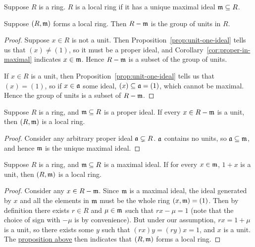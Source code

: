 \begin{definition}
    Suppose \(R\) is a ring.
    \(R\) is a local ring if it has a unique maximal ideal \(\mathfrak{m} \subseteq R\).
\end{definition}
\begin{theorem}
    Suppose \((R,\mathfrak{m})\) forms a local ring.
    Then \(R-\mathfrak{m}\) is the group of units in \(R\).
\end{theorem}
\begin{proof}
    Suppose \(x \in R\) is not a unit.
    Then Proposition~\ref{prop:unit-one-ideal} tells us that \((x) \neq (1)\),
    so it must be a proper ideal,
    and Corollary~\ref{cor:proper-in-maximal} indicates \(x \in \mathfrak{m}\).
    Hence \(R-\mathfrak{m}\) is a subset of the group of units.

    If \(x \in R\) is a unit,
    then Proposition~\ref{prop:unit-one-ideal} tells us that \((x) = (1)\),
    so if \(x \in \mathfrak{a}\) some ideal, \((x) \subseteq \mathfrak{a} = (1)\),
    which cannot be maximal.
    Hence the group of units is a subset of \(R-\mathfrak{m}\).
\end{proof}
\begin{proposition}\label{prop:local-ring-units}
    Suppose \(R\) is a ring, and \(\mathfrak{m} \subseteq R\) is a proper ideal.
    If every \(x \in R-\mathfrak{m}\) is a unit, then \((R,\mathfrak{m})\) is a local ring.
\end{proposition}
\begin{proof}
    Consider any arbitrary proper ideal \(\mathfrak{a} \subsetneq R\).
    \(\mathfrak{a}\) contains no units, so \(\mathfrak{a} \subseteq \mathfrak{m}\),
    and hence \(\mathfrak{m}\) is the unique maximal ideal.
\end{proof}
\begin{proposition}
    Suppose \(R\) is a ring, and \(\mathfrak{m} \subseteq R\) is a maximal ideal.
    If for every \(x \in \mathfrak{m}\), \(1+x\) is a unit, then \((R,\mathfrak{m})\) is a local ring.
\end{proposition}
\begin{proof}
    Consider any \(x \in R-\mathfrak{m}\).
    Since \(\mathfrak{m}\) is a maximal ideal,
    the ideal generated by \(x\) and all the elements in \(\mathfrak{m}\)
    must be the whole ring \((x,\mathfrak{m}) = (1)\).
    Then by definition there exists \(r \in R\) and \(\mu \in \mathfrak{m}\) such that \(rx-\mu = 1\)
    (note that the choice of sign with \(-\mu\) is by convenience).
    But under our assumption, \(rx = 1+\mu\) is a unit,
    so there exists some \(y\) such that \((rx)y = (ry)x = 1\),
    and \(x\) is a unit.
    The \hyperref[prop:local-ring-units]{proposition above}
    then indicates that \((R,\mathfrak{m})\) forms a local ring.
\end{proof}

